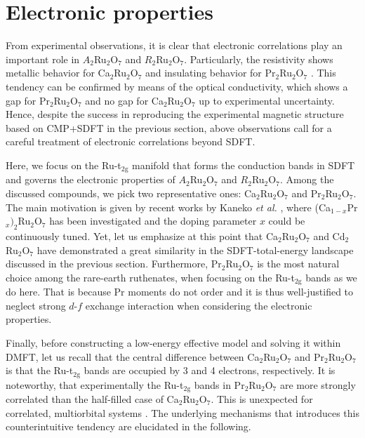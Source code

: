 \documentclass[10pt]{iopart}
\begin{document}
\section{Electronic properties} \label{sec:Electronic properties}

From experimental observations, it is clear that electronic correlations play an important role in $A_2$Ru$_2$O$_7$ and $R_2$Ru$_2$O$_7$. Particularly, 
the resistivity
shows metallic behavior for Ca$_2$Ru$_2$O$_7$ and insulating behavior for Pr$_2$Ru$_2$O$_7$ \cite{kaneko2020,kaneko2021fully}. 
This tendency can be confirmed by means of the optical conductivity, which shows a gap for Pr$_2$Ru$_2$O$_7$ and no gap for  Ca$_2$Ru$_2$O$_7$ up to experimental uncertainty. 
Hence, despite the success in reproducing the experimental magnetic structure based on CMP+SDFT in the previous section, above observations call for a careful treatment of electronic correlations beyond SDFT. 

Here, we focus on the Ru-t$_{2\mathrm{g}}$ manifold that forms the conduction bands in SDFT and governs the electronic properties of $A_2$Ru$_2$O$_7$ and $R_2$Ru$_2$O$_7$. Among the discussed compounds, we pick two representative ones: Ca$_2$Ru$_2$O$_7$ and Pr$_2$Ru$_2$O$_7$. The main motivation is given by recent works by Kaneko {\it et al.} \cite{kaneko2020,kaneko2021fully}, where (Ca$_{1-x}$Pr$_x)_2$Ru$_2$O$_7$ has been investigated and the doping parameter $x$ could be continuously tuned. Yet, let us emphasize at this point that Ca$_2$Ru$_2$O$_7$ and Cd$_2$Ru$_2$O$_7$ have demonstrated a great similarity in the SDFT-total-energy landscape discussed in the previous section. Furthermore, Pr$_2$Ru$_2$O$_7$ is the most natural choice among the rare-earth ruthenates, when focusing on the Ru-t$_{2\mathrm{g}}$ bands as we do here. That is because Pr moments do not order and it is thus well-justified to neglect strong $d$-$f$ exchange interaction when considering the electronic properties.

Finally, before constructing a low-energy effective model and solving it within DMFT, let us recall that the central difference between Ca$_2$Ru$_2$O$_7$ and Pr$_2$Ru$_2$O$_7$ is that the Ru-t$_{2\mathrm{g}}$ bands are occupied by 3 and 4 electrons, respectively. It is noteworthy, that experimentally the Ru-t$_{2\mathrm{g}}$ bands in Pr$_2$Ru$_2$O$_7$ are more strongly correlated than the half-filled case of Ca$_2$Ru$_2$O$_7$. This is unexpected for correlated, multiorbital systems \cite{georges2013strong}. The underlying mechanisms that introduces this counterintuitive tendency are elucidated in the following.
\end{document}
